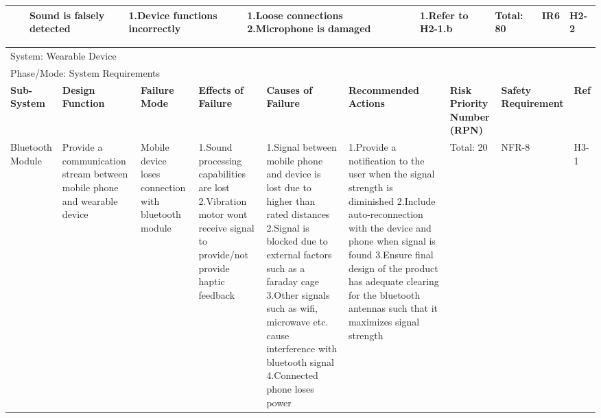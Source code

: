 \documentclass[12pt, titlepage]{article}
\begin{document}
\begin{landscape}
\begin{table}[H]
\begin{tabular}{| p{} | p{}  | p{} | p{} | p{} | p{} | p{} | p{} | p{} |}
         & & Sound is falsely detected & 1.Device functions incorrectly & 1.Loose connections \newline 2.Microphone is damaged & 1.Refer to H2-1.b & Total: 80 & IR6 & H2-2 \\ \hline
     
        \end{tabular}
        \hspace*{-1cm}
\end{table}
\begin{table}[H]
    \centering
        
        \begin{tabular}{| p{} | p{}  | p{} | p{} | p{} | p{} | p{} | p{} | p{} |}
        \hline
        
        \multicolumn{9}{|l|}{System: Wearable Device} \\
        \multicolumn{9}{|l|}{Phase/Mode: System Requirements} \\ \hline
        \textbf{Sub-System} & \textbf{Design Function} & \textbf{Failure Mode} & \textbf{Effects of Failure} & \textbf{Causes of Failure} & \textbf{Recommended Actions} & \textbf{Risk Priority Number (RPN)} & \textbf{Safety Requirement} & \textbf{Ref} \\ \hline
    
         Bluetooth Module & Provide a communication stream between mobile phone and wearable device & Mobile device loses connection with  bluetooth module & 1.Sound processing capabilities are lost \newline 2.Vibration motor wont receive signal to provide/not provide haptic feedback  & 1.Signal between mobile phone and  device is lost due to higher than rated distances \newline 2.Signal is blocked due to external factors such as a faraday cage \newline 3.Other signals such as wifi, microwave etc. cause interference with bluetooth signal \newline 4.Connected phone loses power  & 1.Provide a notification to the user when the signal strength is diminished \newline 2.Include auto-reconnection with the device and phone when signal is found \newline 3.Ensure final design of the product has adequate clearing for the bluetooth antennas such that it maximizes signal strength  &  Total: 20 & NFR-8 & H3-1 \\ \cline{3-9}
    

\end{tabular}
\end{table}
\end{landscape}
\end{document}
